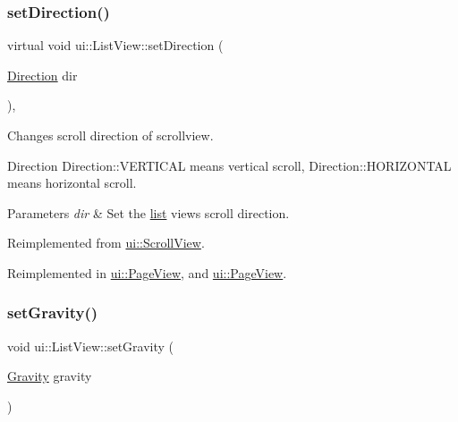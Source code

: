 \subsubsection{\texorpdfstring{set\+Direction()}{setDirection()}\hspace{0.1cm}{\footnotesize\ttfamily [2/2]}}
{\footnotesize\ttfamily virtual void ui\+::\+List\+View\+::set\+Direction (\begin{DoxyParamCaption}\item[{\hyperlink{classui_1_1ScrollView_aed2d778ae8098dcafe323b2beae8dd6b}{Direction}}]{dir }\end{DoxyParamCaption})\hspace{0.3cm}{\ttfamily [override]}, {\ttfamily [virtual]}}

Changes scroll direction of scrollview.

Direction Direction\+::\+V\+E\+R\+T\+I\+C\+AL means vertical scroll, Direction\+::\+H\+O\+R\+I\+Z\+O\+N\+T\+AL means horizontal scroll. 
\begin{DoxyParams}{Parameters}
{\em dir} & Set the \hyperlink{protocollist-p}{list} view\textquotesingle{}s scroll direction. \\
\hline
\end{DoxyParams}


Reimplemented from \hyperlink{classui_1_1ScrollView_a7b30815b6ca380b56c974b6c0b6aa78e}{ui\+::\+Scroll\+View}.



Reimplemented in \hyperlink{classui_1_1PageView_a4ac6e8672026f60e326ffc054d167365}{ui\+::\+Page\+View}, and \hyperlink{classui_1_1PageView_a594124394d2bc1dff86069b87939b14c}{ui\+::\+Page\+View}.

\mbox{\label{classui_1_1ListView_ae65016cdf079cded10de1db27fff4be9}} 
\subsubsection{\texorpdfstring{set\+Gravity()}{setGravity()}\hspace{0.1cm}{\footnotesize\ttfamily [1/2]}}
{\footnotesize\ttfamily void ui\+::\+List\+View\+::set\+Gravity (\begin{DoxyParamCaption}\item[{\hyperlink{classui_1_1ListView_af79b44631b38c1782c384830acf20cf6}{Gravity}}]{gravity }\end{DoxyParamCaption})}

